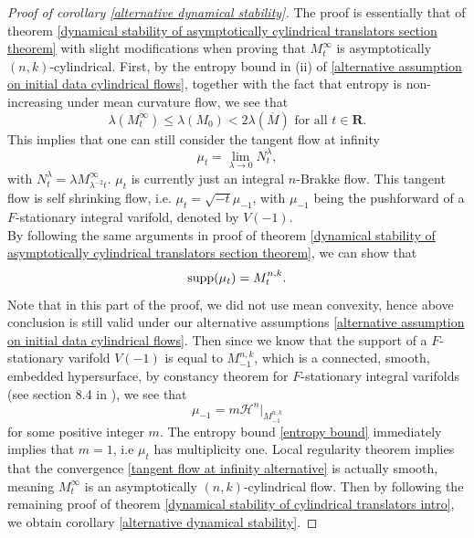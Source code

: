 \documentclass[pdflatex,sn-mathphys-num]{sn-jnl}%
\begin{document}
\begin{proof}[Proof of corollary \ref{alternative dynamical stability}]
The proof is essentially that of theorem \ref{dynamical stability of asymptotically cylindrical translators section theorem} with slight modifications when proving that $M^{\infty}_t$ is asymptotically $(n,k)$-cylindrical. First, by the entropy bound in (ii) of \eqref{alternative assumption on initial data cylindrical flows}, together with the fact that entropy is non-increasing under mean curvature flow, we see that 
\begin{equation}\label{entropy bound}
    \lambda(M^{\infty}_t) \leq \lambda(M_0) < 2\lambda(\overline{M}) \text{ for all }t \in \mathbf{R}.
\end{equation}
This implies that one can still consider the tangent flow at infinity
\begin{equation}\label{tangent flow at infinity alternative}
    \mu_t = \lim_{\lambda \to 0}N^{\lambda}_t,
\end{equation}
with $N^{\lambda}_t = \lambda M^{\infty}_{\lambda^{-2}t}$. $\mu_t$ is currently just an integral $n$-Brakke flow. This tangent flow is self shrinking flow, i.e. $\mu_t = \sqrt{-t}\mu_{-1}$, with $\mu_{-1}$ being the pushforward of a $F$-stationary integral varifold, denoted by $V(-1)$.
\\

By following the same arguments in proof of theorem \ref{dynamical stability of asymptotically cylindrical translators section theorem}, we can show that
\begin{equation}
    \textup{supp}(\mu_t) = M^{n,k}_t.
\end{equation}
Note that in this part of the proof, we did not use mean convexity, hence above conclusion is still valid under our alternative assumptions \eqref{alternative assumption on initial data cylindrical flows}. Then since we know that the support of a $F$-stationary varifold $V(-1)$ is equal to $M^{n,k}_{-1}$, which is a connected, smooth, embedded hypersurface, by constancy theorem for $F$-stationary integral varifolds (see section 8.4 in \cite{simon1984lectures}), we see that 
\begin{equation}
    \mu_{-1}= m\mathcal{H}^n|_{M^{n,k}_{-1}}
\end{equation}
for some positive integer $m$. The entropy bound \eqref{entropy bound} immediately implies that $m = 1$, i.e $\mu_t$ has multiplicity one. Local regularity theorem \cite{White2005-nl} implies that the convergence \eqref{tangent flow at infinity alternative} is actually smooth, meaning $M^{\infty}_t$ is an asymptotically $(n,k)$-cylindrical flow. Then by following the remaining proof of theorem \ref{dynamical stability of cylindrical translators intro}, we obtain corollary \ref{alternative dynamical stability}.
\end{proof}
\end{document}
